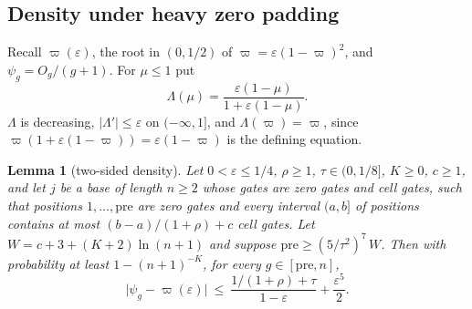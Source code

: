 \documentclass[11pt]{amsart}
\newtheorem{lemma}[theorem]{Lemma}
\theoremstyle{definition}
\theoremstyle{remark}
\newcommand{\eps}{\varepsilon}
\begin{document}
\subsection{Density under heavy zero padding}

Recall $\varpi(\eps)$, the root in $(0,1/2)$ of $\varpi=\eps(1-\varpi)^2$, and
$\psi_g=O_g/(g+1)$. For $\mu\le1$ put
\[
\Lambda(\mu)=\frac{\eps(1-\mu)}{1+\eps(1-\mu)} .
\]
$\Lambda$ is decreasing, $|\Lambda'|\le\eps$ on $(-\infty,1]$, and $\Lambda(\varpi)=\varpi$, since
$\varpi(1+\eps(1-\varpi))=\eps(1-\varpi)$ is the defining equation.

\begin{lemma}[two-sided density]\label{lem:dens2}
Let $0<\eps\le1/4$, $\rho\ge1$, $\tau\in(0,1/8]$, $K\ge0$, $c\ge1$, and let $j$ be a base of length
$n\ge2$ whose gates are zero gates and \emph{cell gates}, such that positions $1,\dots,\mathrm{pre}$
are zero gates and every interval $(a,b]$ of positions contains at most $(b-a)/(1+\rho)+c$ cell
gates. Let $W=c+3+(K+2)\ln(n+1)$ and suppose $\mathrm{pre}\ge(5/\tau^2)^7\,W$. Then with
probability at least $1-(n+1)^{-K}$, for every $g\in[\mathrm{pre},n]$,
\[
\bigl|\psi_g-\varpi(\eps)\bigr|\ \le\ \frac{1/(1+\rho)+\tau}{1-\eps}+\frac{\eps^5}2 .
\]
\end{lemma}
\end{document}
